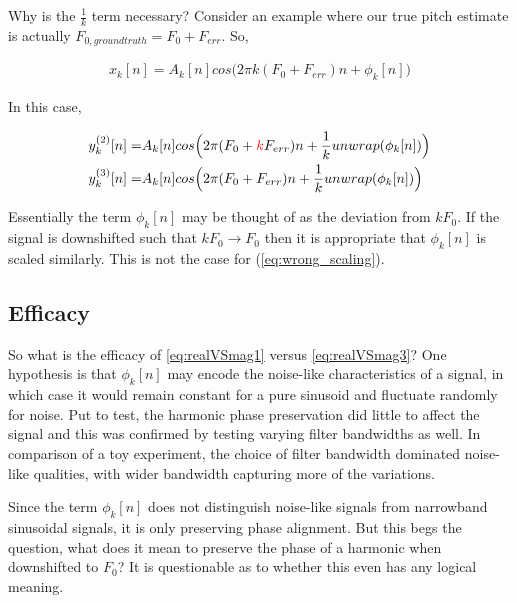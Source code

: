 \documentclass [11pt, proquest,oneside] {ganter_thesis}[2015/03/03]
\newcommand*{\mathcolor}{}
\def\mathcolor#1#{\mathcoloraux{#1}}
\newcommand*{\mathcoloraux}[3]{%
  \protect\leavevmode
  \begingroup
    \color#1{#2}#3%
  \endgroup
}
\begin{document}
Why is the $\frac{1}{k}$ term necessary?  Consider an example where our true pitch estimate is actually $F_{0,ground truth} = F_0 + F_{err}$.  So,

\begin{align}
x_k[n] = A_k[n]cos\Big(2\pi k(F_0 + F_{err})n + \phi_k[n]\Big)
\end{align}

In this case,

\begin{align}
\label{eq:wrong_scaling}
y_k^{(2)}[n] =& A_k[n]cos\Big(2\pi (F_0 + \mathcolor{red}{k}F_{err})n + \frac{1}{k}unwrap(\phi_k[n])\Big) \\
y_k^{(3)}[n] =& A_k[n]cos\Big(2\pi (F_0 + F_{err})n + \frac{1}{k}unwrap(\phi_k[n])\Big)
\end{align}

Essentially the term $\phi_k[n]$ may be thought of as the deviation from $kF_0$.  If the signal is downshifted such that $kF_0 \longrightarrow F_0$ then it is appropriate that $\phi_k[n]$ is scaled similarly.  This is not the case for (\ref{eq:wrong_scaling}).

\subsection{Efficacy}


So what is the efficacy of \ref{eq:realVSmag1} versus \ref{eq:realVSmag3}?  One hypothesis is that $\phi_k[n]$ may encode the noise-like characteristics of a signal, in which case it would remain constant for a pure sinusoid and fluctuate randomly for noise.  Put to test, the harmonic phase preservation did little to affect the signal and this was confirmed by testing varying filter bandwidths as well.  In comparison of a toy experiment, the choice of filter bandwidth dominated noise-like qualities, with wider bandwidth capturing more of the variations.

Since the term $\phi_k[n]$ does not distinguish noise-like signals from narrowband sinusoidal signals, it is only preserving phase alignment.  But this begs the question, what does it mean to preserve the phase of a harmonic when downshifted to $F_0$?  It is questionable as to whether this even has any logical meaning.

\end{document}
